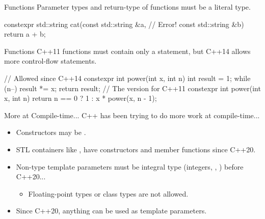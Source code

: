 \begin{frame}[fragile]{ Functions}
    Parameter types and return-type of \constexpr functions must be a literal type.
    \begin{cpp}
constexpr std::string cat(const std::string &a, // Error!
                          const std::string &b) {
  return a + b;
}
    \end{cpp}
\end{frame}

\begin{frame}[fragile]{ Functions}
    C++11 \constexpr functions must contain only a  statement, but C++14 allows more control-flow statements.
    \begin{cpp}
// Allowed since C++14
constexpr int power(int x, int n) {
  int result = 1;
  while (n--)
    result *= x;
  return result;
}
// The version for C++11
constexpr int power(int x, int n) {
  return n == 0 ? 1 : x * power(x, n - 1);
}
    \end{cpp}
\end{frame}

\begin{frame}[fragile]{More at Compile-time...}
    C++ has been trying to do more work at compile-time...
    \begin{itemize}
        \item Constructors may be \constexpr.
        \item STL containers like ,  have \constexpr constructors and member functions since C++20.
        \pause
        \item Non-type template parameters must be integral type (integers, , ) before C++20...
        \begin{itemize}
            \item Floating-point types or class types are not allowed.
        \end{itemize}
        \pause
        \item Since C++20, anything can be used as template parameters.
    \end{itemize}
\end{frame}